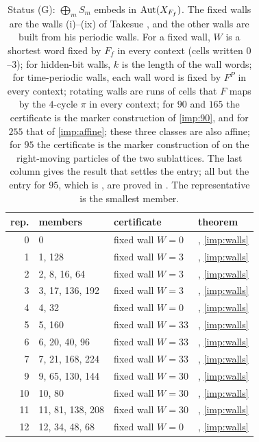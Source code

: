 \begin{table}[!htbp]
\caption{Status (G): $\bigoplus_mS_m$ embeds in $\operatorname{Aut}(X_{F_f})$. The fixed walls are the walls (i)--(ix) of Takesue \cite[Table~III]{Takesue1989}, and the other walls are built from his periodic walls. For a fixed wall, $W$ is a shortest word fixed by $F_f$ in every context (cells written $0$--$3$); for hidden-bit walls, $k$ is the length of the wall words; for time-periodic walls, each wall word is fixed by $F^P$ in every context; rotating walls are runs of cells that $F$ maps by the $4$-cycle $\pi$ in every context; for $90$ and $165$ the certificate is the marker construction of \eqref{imp:90}, and for $255$ that of \eqref{imp:affine}; these three classes are also affine; for $95$ the certificate is the marker construction of \cite[Lemma~6.8]{PaperE} on the right-moving particles of the two sublattices. The last column gives the result that settles the entry; all but the entry for $95$, which is \cite[Corollary~6.10]{PaperE}, are proved in \cite{PaperC}. The representative is the smallest member.}
\label{cl:tab:finite}
\centering\small\renewcommand{\arraystretch}{0.9}
\begin{tabular}{rlll}
\toprule
rep. & members & certificate & theorem\\
\midrule
0 & 0 & fixed wall $W=0$ & \cite{PaperC}, \eqref{imp:walls}\\
1 & 1, 128 & fixed wall $W=3$ & \cite{PaperC}, \eqref{imp:walls}\\
2 & 2, 8, 16, 64 & fixed wall $W=3$ & \cite{PaperC}, \eqref{imp:walls}\\
3 & 3, 17, 136, 192 & fixed wall $W=3$ & \cite{PaperC}, \eqref{imp:walls}\\
4 & 4, 32 & fixed wall $W=0$ & \cite{PaperC}, \eqref{imp:walls}\\
5 & 5, 160 & fixed wall $W=33$ & \cite{PaperC}, \eqref{imp:walls}\\
6 & 6, 20, 40, 96 & fixed wall $W=33$ & \cite{PaperC}, \eqref{imp:walls}\\
7 & 7, 21, 168, 224 & fixed wall $W=33$ & \cite{PaperC}, \eqref{imp:walls}\\
9 & 9, 65, 130, 144 & fixed wall $W=30$ & \cite{PaperC}, \eqref{imp:walls}\\
10 & 10, 80 & fixed wall $W=30$ & \cite{PaperC}, \eqref{imp:walls}\\
11 & 11, 81, 138, 208 & fixed wall $W=30$ & \cite{PaperC}, \eqref{imp:walls}\\
12 & 12, 34, 48, 68 & fixed wall $W=0$ & \cite{PaperC}, \eqref{imp:walls}\\

\end{tabular}
\end{table}
